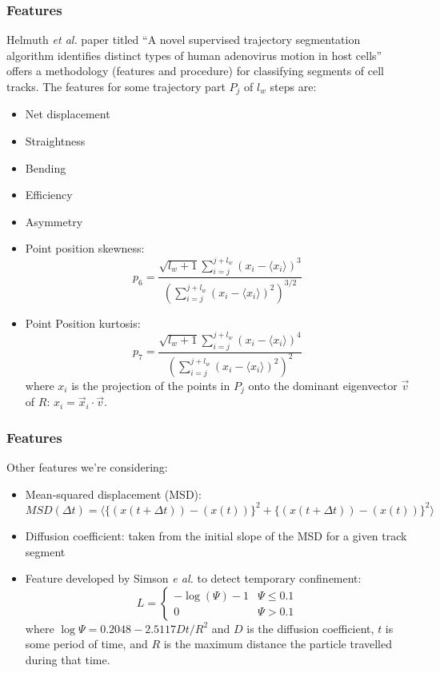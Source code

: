 \documentclass[8pt]{beamer}
\begin{document}
\begin{frame}
  \frametitle{Features}
  Helmuth \emph{et al.} paper titled ``A novel supervised trajectory
  segmentation algorithm identifies distinct types of human adenovirus
  motion in host cells'' offers a methodology (features and procedure)
  for classifying segments of cell tracks.
  The features for some trajectory part $P_j$ of $l_w$ steps are:
  \begin{itemize}
  \item Net displacement
  \item Straightness
  \item Bending
  \item Efficiency
  \item Asymmetry
  \item Point position skewness: 
    \begin{equation*}
      p_6 = \frac{\sqrt{l_w + 1}\sum_{i=j}^{j+l_w}(x_i-\langle x_i
        \rangle)^3}{\left( \sum^{j+l_w}_{i=j}(x_i-\langle x_i
          \rangle)^2  \right)^{3/2}}
    \end{equation*}
  \item Point Position kurtosis: 
    \begin{equation*}
      p_7 = \frac{\sqrt{l_w + 1}\sum^{j+l_w}_{i=j}(x_i-\langle x_i
        \rangle)^4}{\left( \sum^{j+l_w}_{i=j}(x_i-\langle x_i
          \rangle)^2  \right)^{2}}
    \end{equation*}
    where $x_i$ is the projection of the points in $P_j$ onto the
    dominant eigenvector $\vec{v}$ of $R$: $x_i = \vec{x}_i \cdot \vec{v}$.
  \end{itemize}
\end{frame}

\begin{frame}
  \frametitle{Features}
  Other features we're considering:
  \begin{itemize}
  \item Mean-squared displacement (MSD):
    \begin{equation*}
      MSD(\Delta t) = \langle \{ (x(t+\Delta t)) - (x(t)) \}^2 + \{
       (x(t+\Delta t)) - (x(t)) \}^2 \rangle
    \end{equation*}
  \item Diffusion coefficient: taken from the initial slope of the MSD
    for a given track segment
  \item Feature developed by Simson \emph{e al.} to detect temporary
    confinement:
    \begin{equation*}
      L =
      \begin{cases}
        -\log(\Psi) -1 & \Psi \leq 0.1 \\
        0 & \Psi > 0.1
      \end{cases}
    \end{equation*}
    where $\log \Psi = 0.2048 - 2.5117 Dt/R^2$
    and $D$ is the diffusion coefficient, $t$ is some period of
    time, and $R$ is the maximum distance the particle travelled
    during that time.
  \end{itemize}
\end{frame}
\end{document}

